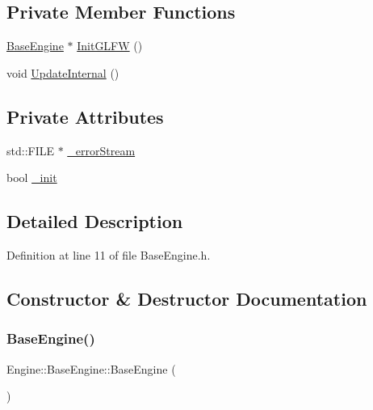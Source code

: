 \subsection*{Private Member Functions}
\begin{DoxyCompactItemize}
\item 
\mbox{\hyperlink{classEngine_1_1BaseEngine}{Base\+Engine}} $\ast$ \mbox{\hyperlink{classEngine_1_1BaseEngine_a3e5950c7d1825f81d7d1fc584cb8b0c1}{Init\+G\+L\+FW}} ()
\item 
void \mbox{\hyperlink{classEngine_1_1BaseEngine_aad3c237ca657b9f22f76fccf7fc7561f}{Update\+Internal}} ()
\end{DoxyCompactItemize}
\subsection*{Private Attributes}
\begin{DoxyCompactItemize}
\item 
std\+::\+F\+I\+LE $\ast$ \mbox{\hyperlink{classEngine_1_1BaseEngine_a26fd54a1ee2733f9c654af5afcfa96cf}{\+\_\+error\+Stream}}
\item 
bool \mbox{\hyperlink{classEngine_1_1BaseEngine_a79e265845b321c0e9822fb170c564e55}{\+\_\+init}}
\end{DoxyCompactItemize}


\subsection{Detailed Description}


Definition at line 11 of file Base\+Engine.\+h.



\subsection{Constructor \& Destructor Documentation}
\mbox{\label{classEngine_1_1BaseEngine_ad838c97afe1790cb35527f0b58e81e6b}} 
\subsubsection{\texorpdfstring{Base\+Engine()}{BaseEngine()}}
{\footnotesize\ttfamily Engine\+::\+Base\+Engine\+::\+Base\+Engine (\begin{DoxyParamCaption}{ }\end{DoxyParamCaption})}



